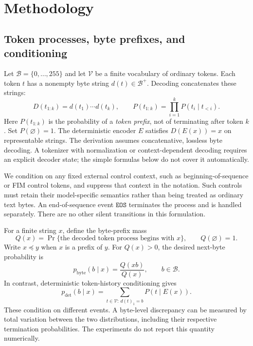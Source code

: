 \documentclass{article}
\newcommand{\bytes}{\mathcal{B}}
\newcommand{\vocab}{\mathcal{V}}
\newcommand{\eos}{\mathtt{EOS}}
\newcommand{\dec}{D}
\newcommand{\enc}{E}
\newcommand{\pref}{\preceq}
\begin{document}
\section{Methodology}
\label{sec:method}
\subsection{Token processes, byte prefixes, and conditioning}
Let $\bytes=\{0,\ldots,255\}$ and let $\vocab$ be a finite vocabulary of ordinary tokens. Each token $t$ has a nonempty byte string $d(t)\in\bytes^+$. Decoding concatenates these strings:
\begin{equation}
 \dec(t_{1:k})=d(t_1)\cdots d(t_k),\qquad
 P(t_{1:k})=\prod_{i=1}^{k}P(t_i\mid t_{<i}).
 \label{eq:tokenprob}
\end{equation}
Here $P(t_{1:k})$ is the probability of a \emph{token prefix}, not of terminating after token $k$. Set $P(\varnothing)=1$. The deterministic encoder $\enc$ satisfies $\dec(\enc(x))=x$ on representable strings. The derivation assumes concatenative, lossless byte decoding. A tokenizer with normalization or context-dependent decoding requires an explicit decoder state; the simple formulas below do not cover it automatically.

We condition on any fixed external control context, such as beginning-of-sequence or FIM control tokens, and suppress that context in the notation. Such controls must retain their model-specific semantics rather than being treated as ordinary text bytes. An end-of-sequence event $\eos$ terminates the process and is handled separately. There are no other silent transitions in this formulation.

For a finite string $x$, define the byte-prefix mass
\begin{equation}
 Q(x)=\Pr\{\text{the decoded token process begins with }x\},\qquad Q(\varnothing)=1.
 \label{eq:prefixmass}
\end{equation}
Write $x\pref y$ when $x$ is a prefix of $y$. For $Q(x)>0$, the desired next-byte probability is
\begin{equation}
 p_{\mathrm{byte}}(b\mid x)=\frac{Q(xb)}{Q(x)},\qquad b\in\bytes.
 \label{eq:byteconditional}
\end{equation}
In contrast, deterministic token-history conditioning gives
\begin{equation}
 p_{\mathrm{det}}(b\mid x)=
 \sum_{t\in\vocab:\,d(t)_1=b}P(t\mid\enc(x)).
 \label{eq:deterministic}
\end{equation}
These condition on different events. A byte-level discrepancy can be measured by total variation between the two distributions, including their respective termination probabilities. The experiments do not report this quantity numerically.
\end{document}
